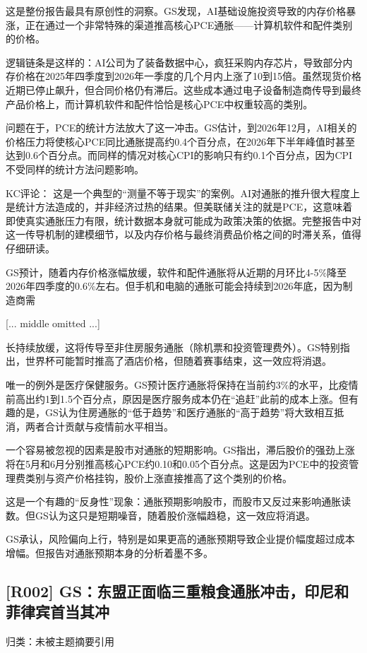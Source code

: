 \documentclass[11pt]{ctexart}
\begin{document}
这是整份报告最具有原创性的洞察。GS发现，AI基础设施投资导致的内存价格暴涨，正在通过一个非常特殊的渠道推高核心PCE通胀——计算机软件和配件类别的价格。

逻辑链条是这样的：AI公司为了装备数据中心，疯狂采购内存芯片，导致部分内存价格在2025年四季度到2026年一季度的几个月内上涨了10到15倍。虽然现货价格近期已停止飙升，但合同价格仍有滞后。这些成本通过电子设备制造商传导到最终产品价格上，而计算机软件和配件恰恰是核心PCE中权重较高的类别。

问题在于，PCE的统计方法放大了这一冲击。GS估计，到2026年12月，AI相关的价格压力将使核心PCE同比通胀提高约0.4个百分点，在2026年下半年峰值时甚至达到0.6个百分点。而同样的情况对核心CPI的影响只有约0.1个百分点，因为CPI不受同样的统计方法问题影响。

KC评论： 这是一个典型的“测量不等于现实”的案例。AI对通胀的推升很大程度上是统计方法造成的，并非经济过热的结果。但美联储关注的就是PCE，这意味着即使真实通胀压力有限，统计数据本身就可能成为政策决策的依据。完整报告中对这一传导机制的建模细节，以及内存价格与最终消费品价格之间的时滞关系，值得仔细研读。

GS预计，随着内存价格涨幅放缓，软件和配件通胀将从近期的月环比4-5\%降至2026年四季度的0.6\%左右。但手机和电脑的通胀可能会持续到2026年底，因为制造商需

[... middle omitted ...]

长持续放缓，这将传导至非住房服务通胀（除机票和投资管理费外）。GS特别指出，世界杯可能暂时推高了酒店价格，但随着赛事结束，这一效应将消退。

唯一的例外是医疗保健服务。GS预计医疗通胀将保持在当前约3\%的水平，比疫情前高出约1到1.5个百分点，原因是医疗服务成本仍在“追赶”此前的成本上涨。但有趣的是，GS认为住房通胀的“低于趋势”和医疗通胀的“高于趋势”将大致相互抵消，两者合计贡献与疫情前水平相当。

一个容易被忽视的因素是股市对通胀的短期影响。GS指出，滞后股价的强劲上涨将在5月和6月分别推高核心PCE约0.10和0.05个百分点。这是因为PCE中的投资管理费类别与资产价格挂钩，股价上涨直接推高了这个类别的价格。

这是一个有趣的“反身性”现象：通胀预期影响股市，而股市又反过来影响通胀读数。但GS认为这只是短期噪音，随着股价涨幅趋稳，这一效应将消退。

GS承认，风险偏向上行，特别是如果更高的通胀预期导致企业提价幅度超过成本增幅。但报告对通胀预期本身的分析着墨不多。

\subsection{[R002] GS：东盟正面临三重粮食通胀冲击，印尼和菲律宾首当其冲}
{\small\color{refgray}归类：未被主题摘要引用}
\end{document}
